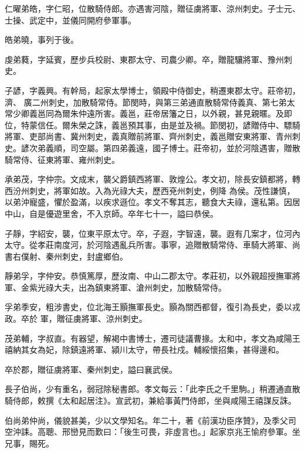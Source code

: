 \begin{pinyinscope}
 仁曜弟皓，字仁昭，位散騎侍郎。亦遇害河陰，贈征虜將軍、涼州刺史。子士元、士操、武定中，並儀同開府參軍事。



 皓弟曉，事列于後。



 虔弟蕤，字延賓，歷步兵校尉、東郡太守、司農少卿。卒，贈龍驤將軍、豫州刺史。



 子諺，字義興。有幹局，起家太學博士，領殿中侍御史，稍遷東郡太守。莊帝初，濟、
 廣二州刺史，加散騎常侍。節閔時，與第三弟通直散騎常侍義真、第七弟太常少卿義邕同為爾朱仲遠所害。義邕，莊帝居籓之日，以外親，甚見親暱。及即位，特蒙信任。爾朱榮之誅，義邕預其事，由是並及禍。節閔初，諺贈侍中、驃騎將軍、吏部尚書、冀州刺史，義真贈前將軍、齊州刺史，義邕贈安東將軍、青州刺史。諺次弟義順，司空屬。第四弟義遠，國子博士。莊帝初，並於河陰遇害，贈散騎常侍、征東將軍、雍州刺史。



 承弟茂，字仲宗。文成末，襲父爵鎮西將軍、敦煌公。孝文初，除長安鎮都將，轉西汾州刺史，將軍如故。入為光祿大夫，歷西兗州刺史，例降
 為侯。茂性謙慎，以弟沖寵盛，懼於盈滿，以疾求遜位。孝文不奪其志，聽食大夫祿，還私第。因居中山，自是優遊里舍，不入京師。卒年七十一，謚曰恭侯。



 子靜，字紹安，襲，位東平原太守。卒，子遐，字智遠，襲。遐有几案才，位河內太守。從孝莊南度河，於河陰遇亂兵所害。事寧，追贈散騎常侍、車騎大將軍、尚書右僕射、秦州刺史，封盧鄉伯。



 靜弟孚，字仲安。恭慎篤厚，歷汝南、中山二郡太守。孝莊初，以外親超授撫軍將軍、金紫光祿大夫，出為鎮東將軍、滄州刺史，加散騎常侍。



 孚弟季安，粗涉書史，位北海王顥撫軍長史。顥為關西都督，復引為長史，委以戎政。卒於
 軍，贈征虜將軍、涼州刺史。



 茂弟輔，字叔直。有器望，解褐中書博士，遷司徒議曹掾。太和中，孝文為咸陽王禧納其女為妃，除鎮遠將軍、潁川太守，帶長社戍。輔綏懷招集，甚得邊和。



 卒於郡，贈征虜將軍、秦州刺史，謚曰襄武侯。



 長子伯尚，少有重名，弱冠除秘書郎。孝文每云：「此李氏之千里駒。」稍遷通直散騎侍郎，敕撰《太和起居注》。宣武初，兼給事黃門侍郎，坐與咸陽王禧謀反誅。



 伯尚弟仲尚，儀貌甚美，少以文學知名。年二十，著《前漢功臣序贊》，及季父司空沖誄。高聰、邢巒見而歎曰：「後生可畏，非虛言也。」起家京兆王愉府參軍。坐兄事，賜死。




\end{pinyinscope}
